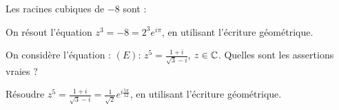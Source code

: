 \begin{question} 
Les racines cubiques de $-8$ sont : 
\begin{answers}
   
    

    
\end{answers}
\begin{explanations}
On résout l'équation $z^3=-8 = 2^3e^{i\pi}$, en utilisant l'écriture géométrique.
\end{explanations}

\end{question}



\begin{question} 
On considère l'équation : $(E) : \, z^5= \frac{1+i}{\sqrt 3-i}$, $z\in \mathbb{C}$.   Quelles sont les assertions vraies ?
\begin{answers}
    

    
\end{answers}
\begin{explanations}
Résoudre $ z^5= \frac{1+i}{\sqrt 3-i}= \frac{1}{\sqrt 2} e^{i\frac{5\pi}{12}}$, en utilisant l'écriture géométrique.
\end{explanations}

\end{question}






